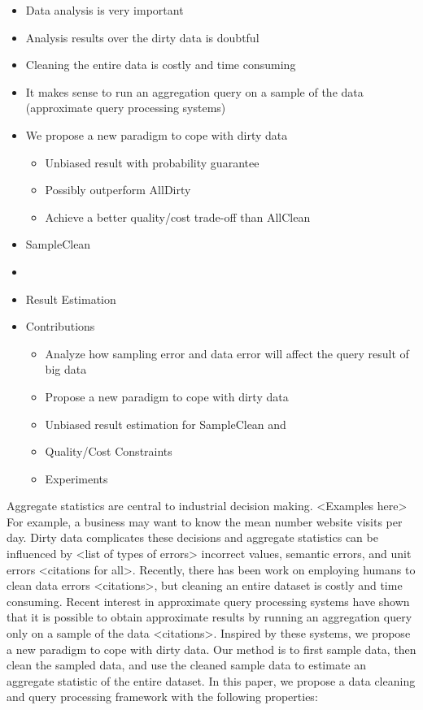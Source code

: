 \begin{itemize}
  \item Data analysis is very important
  \item Analysis results over the dirty data is doubtful
  \item Cleaning the entire data is costly and time consuming
  \item It makes sense to run an aggregation query on a sample of the data (approximate query processing systems)
  \item We propose a new paradigm to cope with dirty data
  \begin{itemize}
     \item{Unbiased result with probability guarantee}
     \item{Possibly outperform AllDirty}
     \item{Achieve a better quality/cost trade-off than AllClean}
  \end{itemize}
  \item SampleClean
  \item \bias
  \item Result Estimation
  \item Contributions
  \begin{itemize}
    \item Analyze how sampling error and data error will affect the query result of big data
    \item Propose a new paradigm to cope with dirty data
    \item Unbiased result estimation for SampleClean and \bias
    \item Quality/Cost Constraints
    \item Experiments
  \end{itemize}
\end{itemize}





Aggregate statistics are central to industrial decision making. <Examples here> For example, a business may want to know the mean number website visits per day.  Dirty data complicates these decisions and aggregate statistics can be influenced by <list of types of errors> incorrect values, semantic errors, and unit errors <citations for all>. Recently, there has been work on employing humans to clean data errors <citations>, but cleaning an entire dataset is costly and time consuming.
Recent interest in approximate query processing systems have shown that it is possible to obtain approximate results by running an aggregation query only on a sample of the data <citations>. Inspired by these systems, we propose a new paradigm to cope with dirty data.  Our method is to first sample data, then clean the sampled data, and use the cleaned sample data to estimate an aggregate statistic of the entire dataset. In this paper, we propose a data cleaning and query processing framework with the following properties:

